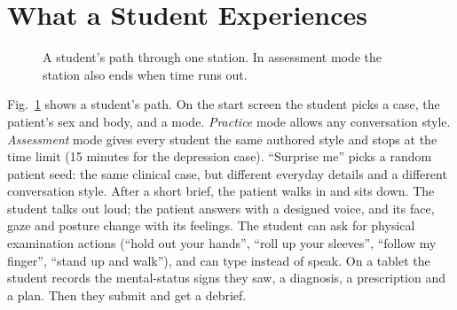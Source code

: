 \documentclass[journal]{IEEEtran}
\begin{document}
\section{What a Student Experiences}\label{sec:student}

\begin{figure}[t]
\centering
{}
\caption{A student's path through one station. In assessment mode the station also ends when time runs out.}
\label{p4:fig:journey}
\end{figure}

Fig.~\ref{p4:fig:journey} shows a student's path. On the start screen the student picks a case, the patient's sex and body, and a mode. \emph{Practice} mode allows any conversation style. \emph{Assessment} mode gives every student the same authored style and stops at the time limit (15 minutes for the depression case). ``Surprise me'' picks a random patient seed: the same clinical case, but different everyday details and a different conversation
style. After a short brief, the patient walks in and sits down. The student talks out loud; the patient answers with a designed voice, and its face,
gaze and posture change with its feelings. The student can ask for physical examination actions (``hold out your hands'', ``roll up your sleeves'',
``follow my finger'', ``stand up and walk''), and can type instead of speak. On a tablet the student records the mental-status signs they saw, a
diagnosis, a prescription and a plan. Then they submit and get a debrief.
\end{document}
